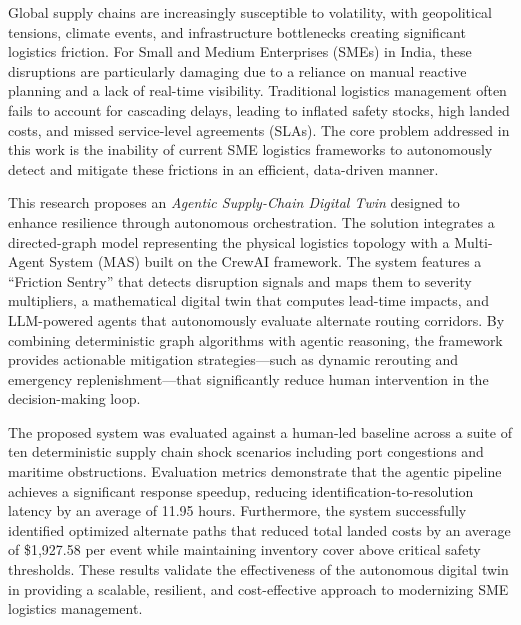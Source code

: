\thispagestyle{empty}\BgThispage\vspace{-1cm}

\vspace{0.5cm}

Global supply chains are increasingly susceptible to volatility, with geopolitical tensions, climate events, and infrastructure bottlenecks creating significant logistics friction. For Small and Medium Enterprises (SMEs) in India, these disruptions are particularly damaging due to a reliance on manual reactive planning and a lack of real-time visibility. Traditional logistics management often fails to account for cascading delays, leading to inflated safety stocks, high landed costs, and missed service-level agreements (SLAs). The core problem addressed in this work is the inability of current SME logistics frameworks to autonomously detect and mitigate these frictions in an efficient, data-driven manner.

This research proposes an \textit{Agentic Supply-Chain Digital Twin} designed to enhance resilience through autonomous orchestration. The solution integrates a directed-graph model representing the physical logistics topology with a Multi-Agent System (MAS) built on the CrewAI framework. The system features a ``Friction Sentry'' that detects disruption signals and maps them to severity multipliers, a mathematical digital twin that computes lead-time impacts, and LLM-powered agents that autonomously evaluate alternate routing corridors. By combining deterministic graph algorithms with agentic reasoning, the framework provides actionable mitigation strategies---such as dynamic rerouting and emergency replenishment---that significantly reduce human intervention in the decision-making loop.

The proposed system was evaluated against a human-led baseline across a suite of ten deterministic supply chain shock scenarios including port congestions and maritime obstructions. Evaluation metrics demonstrate that the agentic pipeline achieves a significant response speedup, reducing identification-to-resolution latency by an average of 11.95 hours. Furthermore, the system successfully identified optimized alternate paths that reduced total landed costs by an average of \$1,927.58 per event while maintaining inventory cover above critical safety thresholds. These results validate the effectiveness of the autonomous digital twin in providing a scalable, resilient, and cost-effective approach to modernizing SME logistics management.

\pagebreak
